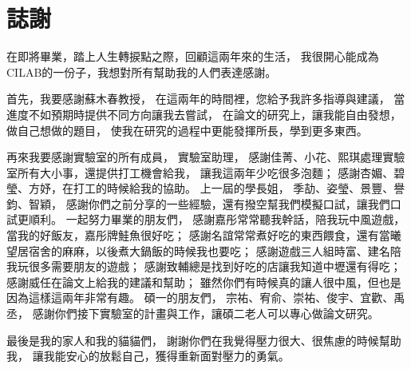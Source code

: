 \documentclass[class=NCU_thesis, crop=false]{standalone}
\begin{document}
\chapter{誌謝}

在即將畢業，踏上人生轉捩點之際，回顧這兩年來的生活，
我很開心能成為CILAB的一份子，我想對所有幫助我的人們表達感謝。

首先，我要感謝蘇木春教授，
在這兩年的時間裡，您給予我許多指導與建議，
當進度不如預期時提供不同方向讓我去嘗試，
在論文的研究上，讓我能自由發想，做自己想做的題目，
使我在研究的過程中更能發揮所長，學到更多東西。

再來我要感謝實驗室的所有成員，
實驗室助理，
感謝佳菁、小花、熙琪處理實驗室所有大小事，還提供打工機會給我，
讓我這兩年少吃很多泡麵；
感謝杏媚、碧瑩、方妤，在打工的時候給我的協助。
上一屆的學長姐，
季劼、姿瑩、景豐、譽鈞、智穎，
感謝你們之前分享的一些經驗，還有撥空幫我們模擬口試，讓我們口試更順利。
一起努力畢業的朋友們，
感謝嘉彤常常聽我幹話，陪我玩中風遊戲，當我的好飯友，嘉彤牌鮭魚很好吃；
感謝名誼常常煮好吃的東西餵食，還有當曦望居宿舍的麻麻，以後煮大鍋飯的時候我也要吃；
感謝遊戲三人組時富、建名陪我玩很多需要朋友的遊戲；
感謝致輔總是找到好吃的店讓我知道中壢還有得吃；
感謝威任在論文上給我的建議和幫助；
雖然你們有時候真的讓人很中風，但也是因為這樣這兩年非常有趣。
碩一的朋友們，
宗祐、宥俞、崇祐、俊宇、宜歡、禹丞，
感謝你們接下實驗室的計畫與工作，讓碩二老人可以專心做論文研究。

最後是我的家人和我的貓貓們，
謝謝你們在我覺得壓力很大、很焦慮的時候幫助我，
讓我能安心的放鬆自己，獲得重新面對壓力的勇氣。
\end{document}
